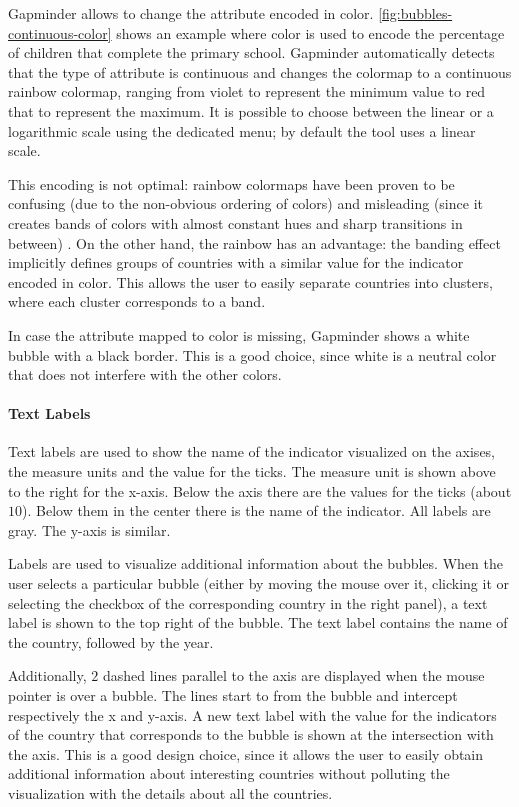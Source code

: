 Gapminder allows to change the attribute encoded in color.
\cref{fig:bubbles-continuous-color} shows an example where color is used to encode the percentage of children that complete the primary school.
Gapminder automatically detects that the type of attribute is continuous and changes the colormap to a continuous rainbow colormap, ranging from violet to represent the minimum value to red that to represent the maximum. It is possible to choose between the linear or a logarithmic scale using the dedicated menu; by default the tool uses a linear scale.

This encoding is not optimal:
rainbow colormaps have been proven to be confusing (due to the non-obvious ordering of colors) and misleading (since it creates bands of colors with almost constant hues and sharp transitions in between) \cite{color-maps}.
On the other hand, the rainbow has an advantage:
the banding effect implicitly defines groups of countries with a similar value for the indicator encoded in color.
This allows the user to easily separate countries into clusters, where each cluster corresponds to a band.

In case the attribute mapped to color is missing, Gapminder shows a white bubble with a black border.
This is a good choice, since white is a neutral color that does not interfere with the other colors.

\paragraph{Text Labels}
Text labels are used to show the name of the indicator visualized on the axises, the measure units and the value for the ticks.
The measure unit is shown above to the right for the x-axis.
Below the axis there are the values for the ticks (about $10$).
Below them in the center there is the name of the indicator.
All labels are gray.
The y-axis is similar.

Labels are used to visualize additional information about the bubbles.
When the user selects a particular bubble (either by moving the mouse over it, clicking it or selecting the checkbox of the corresponding country in the right panel), a text label is shown to the top right of the bubble.
The text label contains the name of the country, followed by the year.

Additionally, $2$ dashed lines parallel to the axis are displayed when the mouse pointer is over a bubble.
The lines start to from the bubble and intercept respectively the x and y-axis.
A new text label with the value for the indicators of the country that corresponds to the bubble is shown at the intersection with the axis.
This is a good design choice, since it allows the user to easily obtain additional information about interesting countries without polluting the visualization with the details about all the countries.

